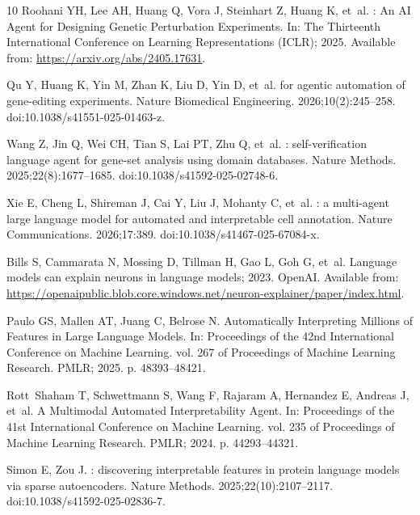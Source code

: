 \documentclass[10pt,letterpaper]{article}
\begin{document}
\begin{thebibliography}{10}
Roohani YH, Lee AH, Huang Q, Vora J, Steinhart Z, Huang K, et~al.
: An {AI} Agent for Designing Genetic Perturbation
  Experiments.
\newblock In: The Thirteenth International Conference on Learning
  Representations (ICLR); 2025. Available from:
  \url{https://arxiv.org/abs/2405.17631}.

Qu Y, Huang K, Yin M, Zhan K, Liu D, Yin D, et~al.
 for agentic automation of gene-editing experiments.
\newblock Nature Biomedical Engineering. 2026;10(2):245--258.
\newblock doi:{10.1038/s41551-025-01463-z}.

Wang Z, Jin Q, Wei CH, Tian S, Lai PT, Zhu Q, et~al.
: self-verification language agent for gene-set analysis
  using domain databases.
\newblock Nature Methods. 2025;22(8):1677--1685.
\newblock doi:{10.1038/s41592-025-02748-6}.

Xie E, Cheng L, Shireman J, Cai Y, Liu J, Mohanty C, et~al.
: a multi-agent large language model for automated and
  interpretable cell annotation.
\newblock Nature Communications. 2026;17:389.
\newblock doi:{10.1038/s41467-025-67084-x}.

Bills S, Cammarata N, Mossing D, Tillman H, Gao L, Goh G, et~al. Language
  models can explain neurons in language models; 2023.
\newblock OpenAI.
\newblock Available from:
  \url{https://openaipublic.blob.core.windows.net/neuron-explainer/paper/index.html}.

Paulo GS, Mallen AT, Juang C, Belrose N.
\newblock Automatically Interpreting Millions of Features in Large Language
  Models.
\newblock In: Proceedings of the 42nd International Conference on Machine
  Learning. vol. 267 of Proceedings of Machine Learning Research. PMLR; 2025.
  p. 48393--48421.

Rott~Shaham T, Schwettmann S, Wang F, Rajaram A, Hernandez E, Andreas J, et~al.
\newblock A Multimodal Automated Interpretability Agent.
\newblock In: Proceedings of the 41st International Conference on Machine
  Learning. vol. 235 of Proceedings of Machine Learning Research. PMLR; 2024.
  p. 44293--44321.

Simon E, Zou J.
: discovering interpretable features in protein language
  models via sparse autoencoders.
\newblock Nature Methods. 2025;22(10):2107--2117.
\newblock doi:{10.1038/s41592-025-02836-7}.


\end{thebibliography}
\end{document}
